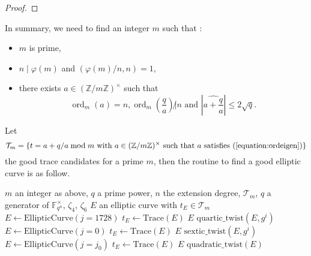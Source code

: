\documentclass[12pt]{article}
\theoremstyle{plain}
\theoremstyle{definition}
\DeclareMathOperator{\order}{ord} %
\def\Z{\ensuremath{\mathbb{Z}}}
\def\F{\ensuremath{\mathbb{F}}}
\newcounter{algorithm}
\begin{document}
\begin{proof}
\end{proof}

In summary, we need to find an integer $m$ such that :
\begin{itemize}
    \item $m$ is prime,
    \item $n\mid\varphi(m)$ and $(\varphi(m)/n,n)=1$,
    \item there exists $a\in(\Z/m\Z)^{\times}$ such that 
\begin{equation}
\label{equation:ordeigen}
\order_m(a) = n,\order_m(\dfrac{q}{a}) \not| n\text{ and }|\widehat{a + \dfrac{q}{a}}| \leq 2\sqrt{q}.
\end{equation}
\end{itemize}
Let
\begin{equation}
\mathcal{T}_m = \lbrace{t = a + q/a \bmod m \text{ with } a\in(\Z/m\Z)^{\times}
\text{ such that } a \text{ satisfies 
}(\ref{equation:ordeigen})}\rbrace
\end{equation}
the good trace candidates for a prime $m$, then the routine to find a good 
elliptic curve is as follow.

\begin{algorithm}
    \label{algorithm:selectell}
    \begin{algorithmic}[1]
    \REQUIRE $m$ an integer as above, $q$ a prime power, $n$ the extension
degree, $\mathcal{T}_m$, $q$ a generator of $\F_{q^n}^{\times}$, $\zeta_4$,
$\zeta_6$
    \ENSURE $E$ an elliptic curve with $t_E\in\mathcal{T}_m$
    \STATE $E\leftarrow \text{EllipticCurve}(j=1728)$
    \STATE $t_E\leftarrow \text{Trace}(E)$
        \RETURN $E$
    \ELSE
                \RETURN $\text{quartic\_twist}(E,g^i)$
            \ENDIF
        \ENDFOR
    \ENDIF
    \STATE $E\leftarrow \text{EllipticCurve}(j=0)$
    \STATE $t_E\leftarrow \text{Trace}(E)$
        \RETURN $E$
    \ELSE
                \RETURN $\text{sextic\_twist}(E,g^i)$
            \ENDIF
        \ENDFOR
    \ENDIF
    \FOR{$j_0\in\F_q$ \AND $j_0\neq0,1728$}
        \STATE $E\leftarrow \text{EllipticCurve}(j=j_0)$
        \STATE $t_E \leftarrow \text{Trace}(E)$
            \RETURN $E$
            \RETURN $\text{quadratic\_twist}(E)$
        \ENDIF
    \ENDFOR
    \end{algorithmic}
\end{algorithm}
\end{document}
